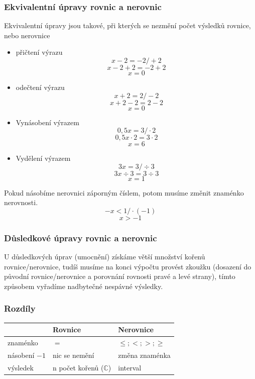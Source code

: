 \subsubsection{Ekvivalentní úpravy rovnic a nerovnic}
Ekvivalentní úpravy jsou takové, při kterých se nezmění počet výsledků rovnice, nebo nerovnice
\begin{itemize}
    \item přičtení výrazu 
    $$
        x-2=-2 /+2
    $$
    $$
        x-2+2=-2+2
    $$
    $$
        x=0
    $$
    \item odečtení výrazu
    $$
        x+2=2 /-2
    $$
    $$
        x+2-2=2-2
    $$
    $$
        x=0
    $$
    \item Vynásobení výrazem
    $$
        0,5x=3 / \cdot 2
    $$
    $$
        0,5x \cdot 2 = 3\cdot2
    $$
    $$
        x=6
    $$
    \item Vydělení výrazem
    $$
        3x=3 / \div3
    $$
    $$
        3x \div 3=3 \div 3
    $$
    $$
    x=1
    $$
    \end{itemize}
    Pokud násobíme nerovnici záporným číslem, potom musíme změnit znaménko nerovnosti.
    $$
        -x<1 / \cdot (-1)
    $$
    $$
        x>-1
    $$
\subsubsection{Důsledkové úpravy rovnic a nerovnic}
U důsledkových úprav (umocnění) získáme větší množství kořenů rovnice/nerovnice, tudíš musíme na konci výpočtu provést zkoužku (dosazení do původní rovnice/nerovnice a porovnání rovnosti pravé a levé strany), tímto způsobem vyřadíme nadbytečné nespávné výsledky.
\subsubsection{Rozdíly}

\begin{tabularx}{0.8\textwidth} { 
  | >{\raggedright\arraybackslash}X 
  | >{\centering\arraybackslash}X 
  | >{\raggedleft\arraybackslash}X | }
 \hline
 & Rovnice & Nerovnice\\
 \hline
 znaménko      &   $=$           & $\leq;<;>;\ge$\\
 násobení $-1$ &   nic se nemění & změna znaménka \\
 výsledek      &   n počet kořenů ($\mathbb{C}$) & interval \\
\hline
\end{tabularx}